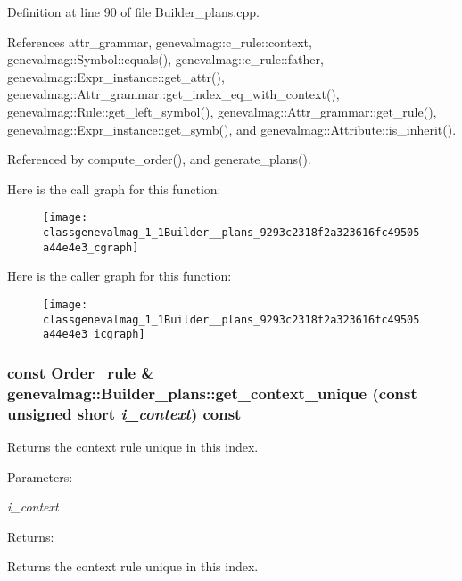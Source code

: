 Definition at line 90 of file Builder\_\-plans.cpp.

References attr\_\-grammar, genevalmag::c\_\-rule::context, genevalmag::Symbol::equals(), genevalmag::c\_\-rule::father, genevalmag::Expr\_\-instance::get\_\-attr(), genevalmag::Attr\_\-grammar::get\_\-index\_\-eq\_\-with\_\-context(), genevalmag::Rule::get\_\-left\_\-symbol(), genevalmag::Attr\_\-grammar::get\_\-rule(), genevalmag::Expr\_\-instance::get\_\-symb(), and genevalmag::Attribute::is\_\-inherit().

Referenced by compute\_\-order(), and generate\_\-plans().

Here is the call graph for this function:\nopagebreak
\begin{figure}[H]
\begin{center}
\leavevmode
\texttt{[image: classgenevalmag\_1\_1Builder\_\_plans\_9293c2318f2a323616fc49505a44e4e3\_cgraph]}
\end{center}
\end{figure}


Here is the caller graph for this function:\nopagebreak
\begin{figure}[H]
\begin{center}
\leavevmode
\texttt{[image: classgenevalmag\_1\_1Builder\_\_plans\_9293c2318f2a323616fc49505a44e4e3\_icgraph]}
\end{center}
\end{figure}
\hypertarget{classgenevalmag_1_1Builder__plans_72ef4716a24888c994c1b0a5c70b88a8}{
\subsubsection[{get\_\-context\_\-unique}]{\setlength{\rightskip}{0pt plus 5cm}const {\bf Order\_\-rule} \& genevalmag::Builder\_\-plans::get\_\-context\_\-unique (const unsigned short {\em i\_\-context}) const}}
\label{classgenevalmag_1_1Builder__plans_72ef4716a24888c994c1b0a5c70b88a8}


Returns the context rule unique in this index.

\begin{Desc}
\item[Parameters:]
\begin{description}
\item[{\em i\_\-context}]\end{description}
\end{Desc}
\begin{Desc}
\item[Returns:]\end{Desc}
Returns the context rule unique in this index. 

